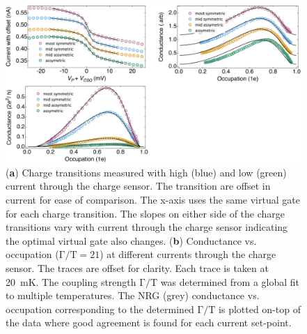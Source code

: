 \begin{figure}[ht]
  \begin{center}
    \includegraphics[width=1\textwidth]{figures/ch3/crop_PosterFiguresMaster.014.png}
    \caption[Conductance vs. Occupation : Varying the coupling symmetry between quantum dot and leads]{\label{fig:ch3/cond_occ_assymetry} 
    (\textbf{a}) Charge transitions measured with high (blue) and low (green) current through the charge sensor. The transition are offset in current for ease of comparison. The x-axis uses the same virtual gate for each charge transition. The slopes on either side of the charge transitions vary with current through the charge sensor indicating the optimal virtual gate also changes. (\textbf{b}) Conductance vs. occupation ($\mathrm{\Gamma/T=21}$) at different currents through the charge sensor. The traces are offset for clarity. Each trace is taken at \qty{20}{mK}. The coupling strength $\mathrm{\Gamma/T}$ was determined from a global fit to multiple temperatures. The NRG (grey) conductance vs. occupation corresponding to the determined $\mathrm{\Gamma/T}$ is plotted on-top of the data where good agreement is found for each current set-point.}
  \end{center}
\end{figure}